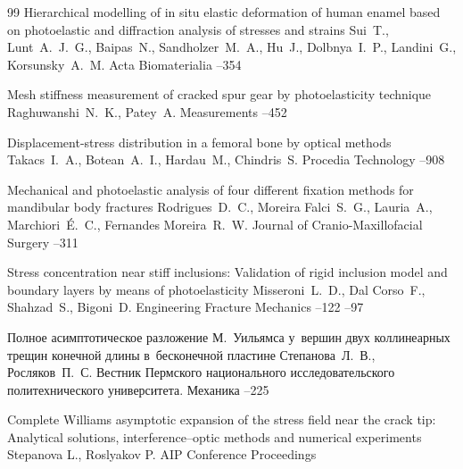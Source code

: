 \begin{thebibliography}{99}
\paper Hierarchical modelling of in situ elastic deformation of human enamel based on photoelastic and diffraction analysis of stresses and strains
\by Sui~T., Lunt~A.~J.~G., Baipas~N., Sandholzer~M.~A., Hu~J., Dolbnya~I.~P., Landini~G., Korsunsky~A.~M.
\jour Acta Biomaterialia
--354


 \paper Mesh stiffness measurement of cracked spur gear by photoelasticity technique
\by Raghuwanshi~N.~K., Patey~A.
\jour Measurements
--452

\paper Displacement-stress distribution in a femoral bone by optical methods
\by Takacs~I.~A., Botean~A.~I., Hardau~M., Chindris~S.
\jour Procedia Technology
--908


\paper Mechanical and photoelastic analysis of four different fixation methods for mandibular body fractures
\by Rodrigues~D.~C., Moreira Falci~S.~G., Lauria~A.,  Marchiori~\'E.~C., Fernandes Moreira~R.~W.
\jour Journal of Cranio-Maxillofacial Surgery
--311



\paper Stress concentration near stiff inclusions: Validation of rigid inclusion model and boundary layers by means of photoelasticity
\by  Misseroni~L.~D., Dal Corso~F., Shahzad~S., Bigoni~D.
\jour Engineering Fracture Mechanics
--122
--97

\paper Полное асимптотическое разложение М.~Уильямса у~вершин двух коллинеарных трещин конечной длины в~бесконечной пластине 
\by Степанова~Л.~В., Росляков~П.~С.
\jour Вестник Пермского национального исследовательского политехнического университета. Механика
--225

\paper Complete Williams asymptotic expansion of the stress field near the crack tip: Analytical solutions, interference–optic methods and numerical experiments
\by Stepanova L., Roslyakov P.
\jour AIP Conference Proceedings



\end{thebibliography}
